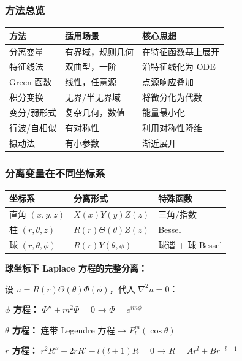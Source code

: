 \subsubsection{方法总览}

\begin{center}
\begin{tabular}{p{3cm}p{4cm}p{4cm}}
\toprule
\textbf{方法} & \textbf{适用场景} & \textbf{核心思想} \\
\midrule
分离变量 & 有界域，规则几何 & 在特征函数基上展开 \\
特征线法 & 双曲型，一阶 & 沿特征线化为 ODE \\
Green 函数 & 线性，任意源 & 点源响应叠加 \\
积分变换 & 无界/半无界域 & 将微分化为代数 \\
变分/弱形式 & 复杂几何，数值 & 能量最小化 \\
行波/自相似 & 有对称性 & 利用对称性降维 \\
摄动法 & 有小参数 & 渐近展开 \\
\bottomrule
\end{tabular}
\end{center}

\subsubsection{分离变量在不同坐标系}

\begin{center}
\begin{tabular}{p{3cm}p{3.5cm}p{4cm}}
\toprule
\textbf{坐标系} & \textbf{分离形式} & \textbf{特殊函数} \\
\midrule
直角 $(x,y,z)$ & $X(x)Y(y)Z(z)$ & 三角/指数 \\
柱 $(r,\theta,z)$ & $R(r)\Theta(\theta)Z(z)$ & Bessel \\
球 $(r,\theta,\phi)$ & $R(r)Y(\theta,\phi)$ & 球谐 + 球 Bessel \\
\bottomrule
\end{tabular}
\end{center}

\textbf{球坐标下 Laplace 方程的完整分离：}

设 $u = R(r)\Theta(\theta)\Phi(\phi)$，代入 $\nabla^2 u = 0$：

\textbf{$\phi$ 方程：} $\Phi'' + m^2\Phi = 0$ → $\Phi = e^{im\phi}$

\textbf{$\theta$ 方程：} 连带 Legendre 方程 → $P_l^m(\cos\theta)$

\textbf{$r$ 方程：} $r^2 R'' + 2rR' - l(l+1)R = 0$ → $R = Ar^l + Br^{-l-1}$

